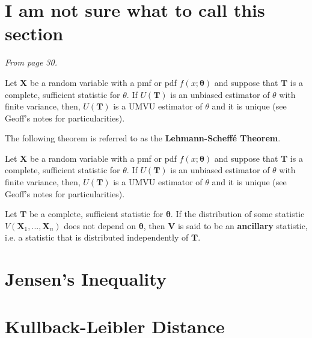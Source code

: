 \section{I am not sure what to call this section}\label{sec:Rao-Blackwell??}

\textit{From page 30.}

\begin{theorem}\label{thm:Rao-Blackwell}
    Let \(\bm{X}\) be a random variable with a pmf or pdf \(f(x;\bm{\theta})\) and suppose that \(\bm{T}\) is a complete, sufficient statistic for \(\theta\). 
    If \(U(\bm{T})\) is an unbiased estimator of \(\theta\) with finite variance, 
    then, \(U(\bm{T})\) is a UMVU estimator of \(\theta\) and it is unique (see Geoff's notes for particularities).
\end{theorem}

The following theorem is referred to as the \textbf{Lehmann-Scheff\'{e} Theorem}.

\begin{theorem}[Theorem 2]\label{thm:thm 2 UMVU}
    Let \(\bm{X}\) be a random variable with a pmf or pdf \(f(x;\bm{\theta})\) and suppose that \(\bm{T}\) is a complete, sufficient statistic for \(\theta\). 
    If \(U(\bm{T})\) is an unbiased estimator of \(\theta\) with finite variance, 
    then, \(U(\bm{T})\) is a UMVU estimator of \(\theta\) and it is unique (see Geoff's notes for particularities).
\end{theorem}

\begin{theorem}\label{thm:Basu's}
    Let \(\bm{T}\) be a complete, sufficient statistic for \(\bm{\theta}\). 
    If the distribution of some statistic \(V(\bm{X}_1,...,\bm{X}_n)\) does not depend on \(\bm{\theta}\), 
    then \(\bm{V}\) is said to be an \textbf{ancillary} statistic, i.e. a statistic that is distributed independently of \(\bm{T}\).
\end{theorem}


\section{Jensen's Inequality}\label{sec:Jensen's ineq}



\section{Kullback-Leibler Distance}\label{sec:Kullback-Leibler}



